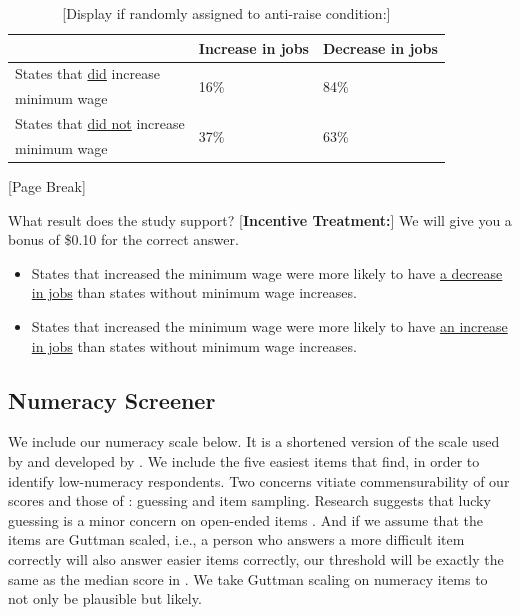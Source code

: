 \vspace{-5mm}
\begin{table}[h]
\centering
\caption*{{[}Display if randomly assigned to anti-raise condition:{]}} \label{tab:siantiwage}
\begin{tabular}{|l|l|l|}
\hline 
  & Increase in jobs  & Decrease in jobs \\\hline
  States that \underline{did} increase     & \multirow{2}{*}{16\%} & \multirow{2}{*}{84\%} \\ 
  minimum wage           &               & \\ \hline
  States that \underline{did not} increase & \multirow{2}{*}{37\%} & \multirow{2}{*}{63\%} \\ 
  minimum wage           &               &  \\\hline
\end{tabular}
\end{table}

\vspace{-2.5mm}
\begin{center}
 {[}Page Break{]}
\end{center}

What result does the study support? {[}\textbf{Incentive Treatment:}{]} We will give you a bonus of \$0.10 for the correct answer.
\begin{itemize}
  \item States that increased the minimum wage were more likely to have \uline{a decrease in jobs} than states without minimum wage increases.
  \item States that increased the minimum wage were more likely to have \uline{an increase in jobs} than states without minimum wage increases.
\end{itemize}

\bigskip
\subsection{Numeracy Screener}
\label{sec:numscreener}
\doublespacing
\setlength{\parindent}{1cm} 

We include our numeracy scale below. It is a shortened version of the scale used by \citet{kahan2017} and developed by \citet{weller2012}. We include the five easiest items that \citeauthor{weller2012} find, in order to identify low-numeracy respondents. Two concerns vitiate commensurability of our scores and those of \citeauthor{kahan2017}: guessing and item sampling. Research suggests that lucky guessing is a minor concern on open-ended items \citep{luskin2011}. And if we assume that the items are Guttman scaled, i.e., a person who answers a more difficult item correctly will also answer easier items correctly, our threshold will be exactly the same as the median score in \citeauthor{kahan2017}. We take Guttman scaling on numeracy items to not only be plausible but likely.

